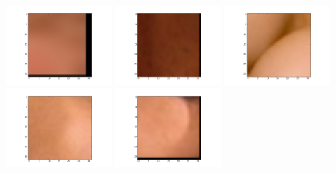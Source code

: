 \includegraphics[width=4cm]{dbshow-1-0.png} 
\includegraphics[width=4cm]{dbshow-1-1.png} 
\includegraphics[width=4cm]{dbshow-1-2.png} 
\includegraphics[width=4cm]{dbshow-1-3.png} 
\includegraphics[width=4cm]{dbshow-1-4.png} 
